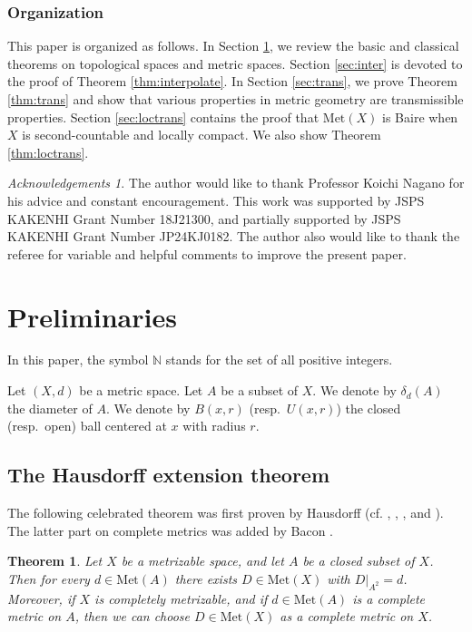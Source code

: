 \documentclass[a4paper, 12pt]{amsart}
\theoremstyle{plain}
\newtheorem{thm}{Theorem}[section]
\theoremstyle{definition}
\theoremstyle{remark}
\newtheorem*{ac}{Acknowledgements}
\newcommand{\nn}{\mathbb{N}}
\newcommand{\met}[1]{\mathrm{Met}(#1)}
\begin{document}
\subsubsection{Organization}
This paper is organized  as follows. 
In Section 
\ref{sec:pre}, 
we review 
the basic and  classical  theorems 
on topological spaces 
and metric spaces. 
Section \ref{sec:inter} is devoted to
the  proof of  Theorem 
\ref{thm:interpolate}. 
In Section 
\ref{sec:trans}, 
we prove Theorem 
\ref{thm:trans} 
and show that 
various properties in metric geometry are transmissible properties. 
 Section 
\ref{sec:loctrans}
contains the proof that 
$\met{X}$ is Baire when 
$X$ is second-countable and locally compact. 
We also show  Theorem 
\ref{thm:loctrans}. 






\begin{ac}
The author would like to thank Professor Koichi Nagano for his advice and constant encouragement. 
This work was supported by JSPS KAKENHI Grant Number 18J21300, 
and partially supported by 
JSPS 
KAKENHI Grant Number 
JP24KJ0182. 
The author also would like to 
thank the referee
 for variable and helpful comments to 
improve the present paper. 
\end{ac}




\section{Preliminaries}\label{sec:pre}
In this paper, the symbol 
$\nn$ 
stands for the set of all positive integers.
 
Let 
$(X, d)$ 
be a metric space. 
Let 
$A$ 
be a subset of
 $X$.  
We denote by 
$\delta_{d}(A)$ 
the diameter of 
$A$. 
We denote by 
$B(x, r)$ 
(resp.~$U(x, r)$) 
the closed 
(resp.~open) ball centered at 
$x$ 
with radius 
$r$. 
\subsection{The Hausdorff extension theorem}
The following celebrated theorem was first proven by Hausdorff 
\cite{Ha1930}
(cf. \cite{Hausdorff1938}, 
\cite{MR0024609}, 
\cite{MR0230285}, 
and 
\cite{MR321026}). 
The latter part on complete
metrics 
was added by 
Bacon 
\cite{MR0049543}. 
\begin{thm}\label{thm:Hausdorff}
Let 
$X$ be a metrizable space,  
and let 
$A$ 
be a closed subset of 
$X$. 
Then for every 
$d\in \met{A}$ 
there exists 
$D\in \met{X}$ 
with 
$D|_{A^2}=d$. 
Moreover, 
if 
$X$ is completely metrizable,  
and if 
$d\in \met{A}$ 
is  a complete metric on 
$A$, 
then we can choose 
$D\in \met{X}$ 
as a complete metric on 
$X$. 
\end{thm}
\end{document}
